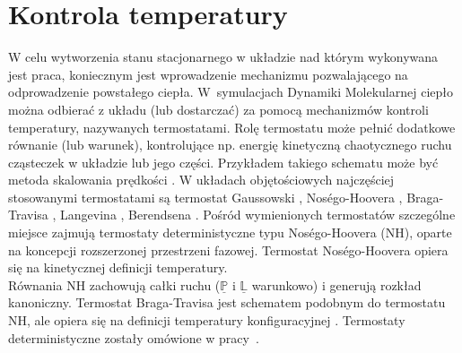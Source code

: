 \documentclass[12pt,a4paper,openright]{report} %
\begin{document}
\section{Kontrola temperatury}
\label{kontrola_temp}
W celu wytworzenia stanu stacjonarnego w układzie nad którym wykonywana jest praca, koniecznym jest wprowadzenie mechanizmu pozwalającego na odprowadzenie powstałego ciepła. W~symulacjach Dynamiki Molekularnej ciepło można odbierać z układu (lub dostarczać) za pomocą mechanizmów kontroli temperatury, nazywanych termostatami. Rolę termostatu może pełnić dodatkowe równanie (lub warunek), kontrolujące np. energię kinetyczną chaotycznego ruchu cząsteczek w układzie lub jego części. Przykładem takiego schematu może być metoda skalowania prędkości \cite{Woodcock1971}. W układach objętościowych najczęściej stosowanymi termostatami są termostat Gaussowski \cite{Evans1983, Hoover1983}, Nos\'{e}go-Hoovera \cite{Nose1984, Hoover1985}, Braga-Travisa \cite{Braga2005, Travis2006, Travis2008}, Langevina \cite{Schneider1978}, Berendsena \cite{Berendsen1984}. Pośród wymienionych termostatów szczególne miejsce zajmują termostaty deterministyczne typu Nos\'{e}go-Hoovera (NH), oparte na koncepcji rozszerzonej przestrzeni fazowej. Termostat Nos\'{e}go-Hoovera opiera się na kinetycznej definicji temperatury. \\Równania NH zachowują całki ruchu ($\underline{\mathbb{P}}$ i $\underline{\mathbb{L}}$ warunkowo) i generują rozkład kanoniczny. Termostat Braga-Travisa jest schematem podobnym do termostatu NH, ale opiera się na definicji temperatury konfiguracyjnej \cite{Braga2005, Travis2006, Travis2008}. Termostaty deterministyczne zostały omówione w pracy~\cite{Pieprzyk2015}. 
\end{document}
